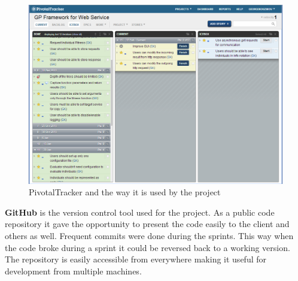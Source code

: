 \begin{figure}[htp]
\centering
\includegraphics[scale=0.5]{Figures/pivotalTracker.png}
\caption{PivotalTracker and the way it is used by the project}
\label{fig:pivotalTracker}
\end{figure}

\textbf{GitHub} is the version control tool used for the project. As a public code repository it gave the opportunity to present the code easily to the client and
others as well. Frequent commits were done during the sprints. This way when the code broke during a sprint it could be reversed back to a working version. The repository
is easily accessible from everywhere making it useful for development from  multiple machines.
